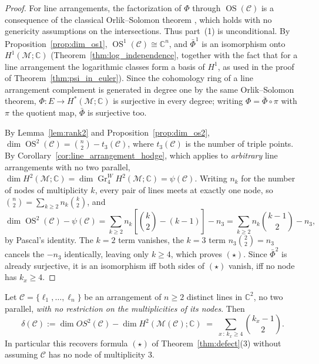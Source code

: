 \documentclass[article,11pt]{amsart} \numberwithin{equation}{section}
\numberwithin{equation}{section}
\begin{document}
{\begin{proof}
	For line arrangements, the factorization of $\Phi$ through $\operatorname{OS}(\mathcal C)$
	is a consequence of the classical Orlik--Solomon theorem \cite{OrlikSolomon,OrlikTerao},
	which holds with no genericity assumptions on the intersections. Thus part~(1) is unconditional.
	By Proposition~\ref{prop:dim_os1}, $\operatorname{OS}^1(\mathcal C)\cong\mathbb C^n$, and
	$\bar\Phi^1$ is an isomorphism onto $H^1(\mathcal M;\mathbb C)$ (Theorem~\ref{thm:log_independence},
	together with the fact that for a line arrangement the logarithmic classes form a basis of $H^1$,
	as used in the proof of Theorem~\ref{thm:psi_in_euler}). Since the cohomology ring of a line
	arrangement complement is generated in degree one by the same Orlik--Solomon theorem,
	$\Phi:E\longrightarrow H^*(\mathcal M;\mathbb C)$ is surjective in every degree; writing
	$\Phi=\bar\Phi\circ\pi$ with $\pi$ the quotient map, $\bar\Phi$ is surjective too.
	
	By Lemma~\ref{lem:rank2} and Proposition~\ref{prop:dim_os2}, 
	$\dim \operatorname{OS}^2(\mathcal C)=\binom{n}{2}-t_3(\mathcal C)$,
	where $t_3(\mathcal C)$ is the number of triple points. By Corollary~\ref{cor:line_arrangement_hodge},
	which applies to \emph{arbitrary} line arrangements with no two parallel,
	$\dim H^2(\mathcal M;\mathbb C)=\dim\operatorname{Gr}^W_4H^2(\mathcal M;\mathbb C)=\psi(\mathcal C)$.
	Writing $n_k$ for the number of nodes of multiplicity $k$, every pair of lines meets at
	exactly one node, so $\binom{n}{2}=\sum_{k\ge2} n_k\binom{k}{2}$, and
	\[
	\dim \operatorname{OS}^2(\mathcal C)-\psi(\mathcal C)
	=\sum_{k\ge2}n_k\left[\binom{k}{2}-(k-1)\right]-n_3
	=\sum_{k\ge2}n_k\binom{k-1}{2}-n_3,
	\]
	by Pascal's identity. The $k=2$ term vanishes, the $k=3$ term $n_3\binom{2}{2}=n_3$ cancels
	the $-n_3$ identically, leaving only $k\ge4$, which proves $(\star)$. Since $\bar\Phi^2$ is
	already surjective, it is an isomorphism iff both sides of $(\star)$ vanish, iff no node has
	$k_x\ge4$.
\end{proof}

\begin{inp}
	\label{prop:general-defect}
	Let $\mathcal C=\{\ell_1,\dots,\ell_n\}$ be an arrangement of $n\ge2$ distinct
	lines in $\mathbb C^2$, no two parallel, \emph{with no restriction on the
		multiplicities of its nodes}. Then
	\[
	\delta(\mathcal C):=\dim OS^2(\mathcal C)-\dim H^2(\mathcal M(\mathcal C);\mathbb C)
	\;=\;\sum_{x\,:\,k_x\ge4}\binom{k_x-1}{2}. \tag{$\star\star$}
	\]
	In particular this recovers formula $(\star)$ of Theorem~\ref{thm:defect}(3) without
	assuming $\mathcal C$ has no node of multiplicity $3$.
\end{inp}

}
\end{document}
